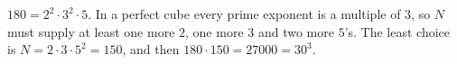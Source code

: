 $180=2^2\cdot3^2\cdot5$. In a perfect cube every prime exponent is a multiple of $3$, so $N$ must supply at least one more $2$, one more $3$ and two more $5$'s. The least choice is $N=2\cdot3\cdot5^2=\boxed{150}$, and then $180\cdot150=27000=30^3$.

